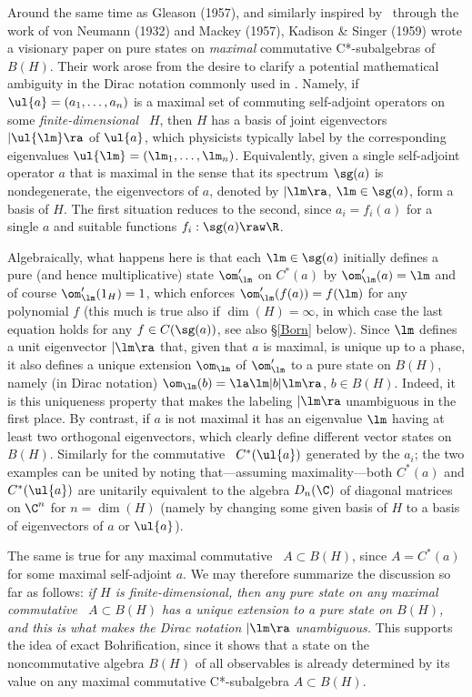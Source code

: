 \documentclass[12pt]{article}
\begin{document}
Around the same time as Gleason (1957), and similarly inspired by \qm\ through the work of von Neumann (1932) and Mackey (1957), Kadison \& Singer (1959) wrote a visionary paper on pure states on \emph{maximal} commutative C*-subalgebras of $B(H)$. 
Their work   arose from the  desire to clarify a potential mathematical ambiguity in the Dirac notation commonly used in \qm.
Namely, if $\ul{a}=(a_1, \ldots, a_n)$ is
 a maximal set of commuting self-adjoint operators on some \emph{finite-dimensional} \Hs\ $H$,   
then $H$ has a basis of joint eigenvectors $|\ul{\lm}\ra$ of $\ul{a}$, which physicists typically label by the corresponding eigenvalues 
$\ul{\lm}=(\lm_1, \ldots, \lm_n)$. Equivalently, given a single  self-adjoint operator $a$ that is maximal in the sense that its spectrum $\sg(a)$ is nondegenerate, the eigenvectors of $a$, denoted by $|\lm\ra$, $\lm\in\sg(a)$, form a basis of $H$. The first situation reduces to the second, since $a_i=f_i(a)$ for a single $a$ and suitable functions $f_i:\sg(a)\raw\R$. 

Algebraically, what happens here is that each $\lm\in\sg(a)$ initially  defines a pure (and hence multiplicative) state $\om'_{\lm}$ on $C^*(a)$ by  $\om'_{\lm}(a)=\lm$ and of course  $\om'_{\lm}(1_H)=1$, which enforces
 $\om'_{\lm}(f(a))=f(\lm)$ for any polynomial $f$ (this much is true also if $\dim(H)=\infty$, in which case the last equation holds  for any $f\in C(\sg(a))$, see also \S\ref{Born} below).  Since $\lm$ defines a unit eigenvector $|\lm\ra$ that, given that $a$ is maximal, is unique up to a phase, it also defines a unique  extension $\om_{\lm}$ of $\om'_{\lm}$  to a pure state  on  $B(H)$, namely (in Dirac notation) $\om_{\lm}(b)=\la\lm|b|\lm\ra$, $b\in B(H)$. Indeed, it is this uniqueness property that
 makes the labeling $|\lm\ra$ unambiguous in the first place. By contrast, if $a$ is not maximal  it has an  eigenvalue $\lm$ having at least two orthogonal eigenvectors, which clearly define different vector states on $B(H)$. Similarly for 
 the commutative \ca\   $C^*(\ul{a})$ generated by the $a_i$;  the two examples can be united by noting that---assuming maximality---both $C^*(a)$ and $C^*(\ul{a})$ are unitarily equivalent to the algebra $D_n(\C)$ of diagonal matrices on $\C^n$ for  $n=\dim(H)$ (namely by changing some given basis of $H$  to a basis of eigenvectors of  $a$ or $\ul{a}$). 
  
 The same is true for any maximal commutative \ca\ $A\subset B(H)$, since $A=C^*(a)$ for some maximal self-adjoint $a$.
We may therefore summarize the discussion so far as follows: \emph{if $H$ is finite-dimensional, then
  any pure state on any maximal commutative \ca\ $A\subset B(H)$ has a unique extension to a pure state on $B(H)$, and this is what makes  the Dirac notation $|\lm\ra$ unambiguous.} This supports the idea of exact Bohrification,  since it shows that a state on the noncommutative algebra  $B(H)$ of all observables  is already determined by its value on any maximal commutative C*-subalgebra $A\subset B(H)$.
 
\end{document}
